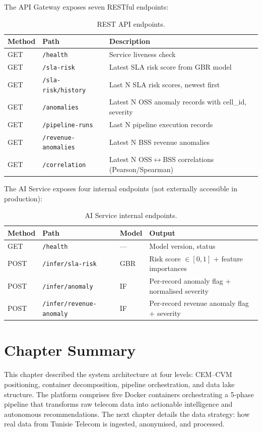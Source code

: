 The API Gateway exposes seven RESTful endpoints:

\begin{table}[H]
\centering
\caption{REST API endpoints.}
\label{tab:api-endpoints}
\begin{tabularx}{\textwidth}{@{}llX@{}}
\toprule
\textbf{Method} & \textbf{Path} & \textbf{Description} \\
\midrule
GET & \texttt{/health}              & Service liveness check \\
GET & \texttt{/sla-risk}            & Latest SLA risk score from GBR model \\
GET & \texttt{/sla-risk/history}    & Last N SLA risk scores, newest first \\
GET & \texttt{/anomalies}           & Latest N OSS anomaly records with cell\_id, severity \\
GET & \texttt{/pipeline-runs}       & Last N pipeline execution records \\
GET & \texttt{/revenue-anomalies}   & Latest N BSS revenue anomalies \\
GET & \texttt{/correlation}         & Latest N OSS$\leftrightarrow$BSS correlations (Pearson/Spearman) \\
\bottomrule
\end{tabularx}
\end{table}

The AI Service exposes four internal endpoints (not externally accessible in production):

\begin{table}[H]
\centering
\caption{AI Service internal endpoints.}
\label{tab:ai-endpoints}
\begin{tabularx}{\textwidth}{@{}lllX@{}}
\toprule
\textbf{Method} & \textbf{Path} & \textbf{Model} & \textbf{Output} \\
\midrule
GET  & \texttt{/health}                & ---   & Model version, status \\
POST & \texttt{/infer/sla-risk}        & GBR & Risk score $\in [0, 1]$ + feature importances \\
POST & \texttt{/infer/anomaly}         & IF  & Per-record anomaly flag + normalised severity \\
POST & \texttt{/infer/revenue-anomaly} & IF  & Per-record revenue anomaly flag + severity \\
\bottomrule
\end{tabularx}
\end{table}

\section{Chapter Summary}

This chapter described the system architecture at four levels: CEM--CVM positioning, container decomposition, pipeline orchestration, and data lake structure. The platform comprises five Docker containers orchestrating a 5-phase pipeline that transforms raw telecom data into actionable intelligence and autonomous recommendations. The next chapter details the data strategy: how real data from Tunisie Telecom is ingested, anonymised, and processed.
